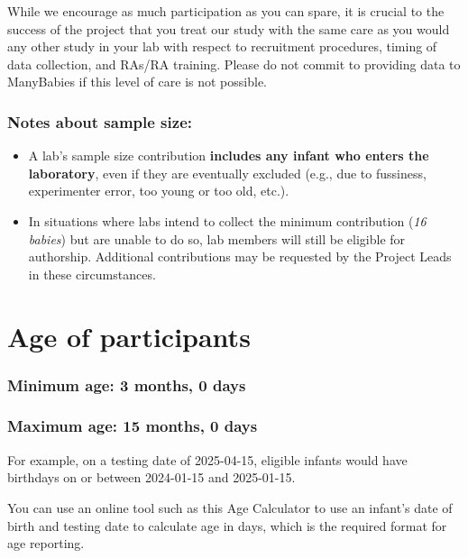 \documentclass[
  letterpaper,
  DIV=11,
  numbers=noendperiod,
  oneside]{scrreprt}
\providecommand{\tightlist}{%
  \setlength{\itemsep}{0pt}\setlength{\parskip}{0pt}}
\begin{document}
While we encourage as much participation as you can spare, it is crucial
to the success of the project that you treat our study with the same
care as you would any other study in your lab with respect to
recruitment procedures, timing of data collection, and RAs/RA training.
Please do not commit to providing data to ManyBabies if this level of
care is not possible.

\subsubsection{Notes about sample size:}\label{notes-about-sample-size}

\begin{itemize}
\tightlist
\item
  A lab's sample size contribution \textbf{includes any infant who
  enters the laboratory}, even if they are eventually excluded (e.g.,
  due to fussiness, experimenter error, too young or too old, etc.).
\item
  In situations where labs intend to collect the minimum contribution
  (\emph{16 babies}) but are unable to do so, lab members will still be
  eligible for authorship. Additional contributions may be requested by
  the Project Leads in these circumstances.
\end{itemize}

\section{Age of participants}\label{age-of-participants}

\subsubsection{\texorpdfstring{\textbf{Minimum age:} 3 months, 0
days}{Minimum age: 3 months, 0 days}}\label{minimum-age-3-months-0-days}

\subsubsection{\texorpdfstring{\textbf{Maximum age:} 15 months, 0
days}{Maximum age: 15 months, 0 days}}\label{maximum-age-15-months-0-days}

For example, on a testing date of 2025-04-15, eligible infants would
have birthdays on or between 2024-01-15 and 2025-01-15.

You can use an online tool such as this Age Calculator to use an
infant's date of birth and testing date to calculate age in days, which
is the required format for age reporting.
\end{document}
